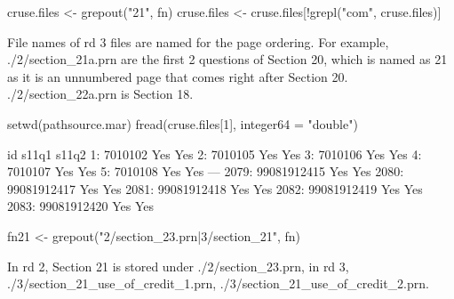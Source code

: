 \begin{Schunk}
\begin{Sinput}
cruse.files <- grepout("21", fn)
cruse.files <- cruse.files[!grepl("com", cruse.files)]
\end{Sinput}
\end{Schunk}
File names of rd 3 files are named for the page ordering. For example, \textsf{\footnotesize./2/section\_21a.prn} are the first 2 questions of Section 20, which is named as 21 as it is an unnumbered page that comes right after Section 20. \textsf{\footnotesize./2/section\_22a.prn} is Section 18.
\begin{Schunk}
\begin{Sinput}
setwd(pathsource.mar)
fread(cruse.files[1], integer64 = "double")
\end{Sinput}
\begin{Soutput}
               id s11q1 s11q2
   1:     7010102   Yes   Yes
   2:     7010105   Yes   Yes
   3:     7010106   Yes   Yes
   4:     7010107   Yes   Yes
   5:     7010108   Yes   Yes
  ---                        
2079: 99081912415   Yes   Yes
2080: 99081912417   Yes   Yes
2081: 99081912418   Yes   Yes
2082: 99081912419   Yes   Yes
2083: 99081912420   Yes   Yes
\end{Soutput}
\begin{Sinput}
fn21 <- grepout("2/section_23.prn|3/section_21", fn)
\end{Sinput}
\end{Schunk}
In rd 2, Section 21 is stored under \textsf{\footnotesize./2/section\_23.prn}, in rd 3, \textsf{\footnotesize./3/section\_21\_use\_of\_credit\_1.prn, ./3/section\_21\_use\_of\_credit\_2.prn}.
\begin{Schunk}
\end{Schunk}
